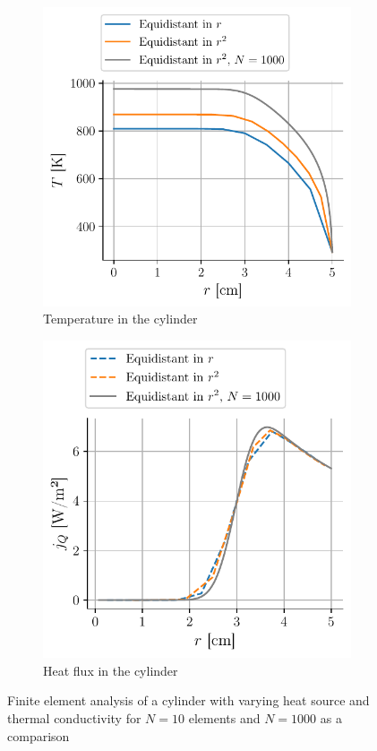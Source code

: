 \begin{figure}[h]
    \centering
    \begin{subfigure}{0.48\linewidth}
        \centering
        \includegraphics[width=\linewidth]{figures/var_T.pdf}
        \caption{Temperature in the cylinder}
        \label{fig:var_T}
    \end{subfigure}
    \begin{subfigure}{0.48\linewidth}
        \centering
        \includegraphics[width=\linewidth]{figures/var_j.pdf}
        \caption{Heat flux in the cylinder}
        \label{fig:var_j}
    \end{subfigure}
    \caption{Finite element analysis of a cylinder with varying heat source and thermal conductivity for $N = 10$ elements and $N=1000$ as a comparison}
    \label{fig:var_behavior}
\end{figure}

